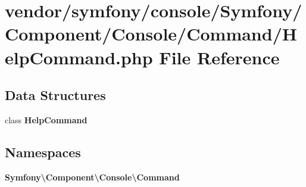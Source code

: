 \section{vendor/symfony/console/\+Symfony/\+Component/\+Console/\+Command/\+Help\+Command.php File Reference}
\label{symfony_2console_2_symfony_2_component_2_console_2_command_2_help_command_8php}
\subsection*{Data Structures}
\begin{DoxyCompactItemize}
\item 
class {\bf Help\+Command}
\end{DoxyCompactItemize}
\subsection*{Namespaces}
\begin{DoxyCompactItemize}
\item 
 {\bf Symfony\textbackslash{}\+Component\textbackslash{}\+Console\textbackslash{}\+Command}
\end{DoxyCompactItemize}
